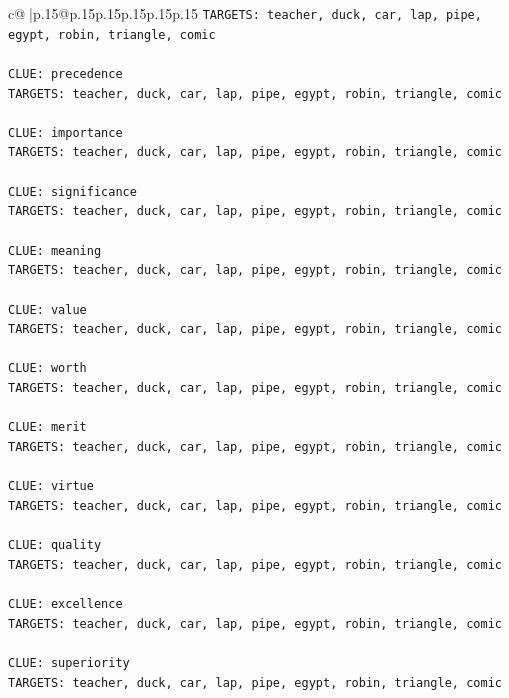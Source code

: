\documentclass{article}
\begin{document}
{\begin{supertabular}{c@{$\;$}|p{.15\linewidth}@{}p{.15\linewidth}p{.15\linewidth}p{.15\linewidth}p{.15\linewidth}p{.15\linewidth}}
{{{\texttt{TARGETS: teacher, duck, car, lap, pipe, egypt, robin, triangle, comic} \\
\\ 
\texttt{CLUE: precedence} \\
\texttt{TARGETS: teacher, duck, car, lap, pipe, egypt, robin, triangle, comic} \\
\\ 
\texttt{CLUE: importance} \\
\texttt{TARGETS: teacher, duck, car, lap, pipe, egypt, robin, triangle, comic} \\
\\ 
\texttt{CLUE: significance} \\
\texttt{TARGETS: teacher, duck, car, lap, pipe, egypt, robin, triangle, comic} \\
\\ 
\texttt{CLUE: meaning} \\
\texttt{TARGETS: teacher, duck, car, lap, pipe, egypt, robin, triangle, comic} \\
\\ 
\texttt{CLUE: value} \\
\texttt{TARGETS: teacher, duck, car, lap, pipe, egypt, robin, triangle, comic} \\
\\ 
\texttt{CLUE: worth} \\
\texttt{TARGETS: teacher, duck, car, lap, pipe, egypt, robin, triangle, comic} \\
\\ 
\texttt{CLUE: merit} \\
\texttt{TARGETS: teacher, duck, car, lap, pipe, egypt, robin, triangle, comic} \\
\\ 
\texttt{CLUE: virtue} \\
\texttt{TARGETS: teacher, duck, car, lap, pipe, egypt, robin, triangle, comic} \\
\\ 
\texttt{CLUE: quality} \\
\texttt{TARGETS: teacher, duck, car, lap, pipe, egypt, robin, triangle, comic} \\
\\ 
\texttt{CLUE: excellence} \\
\texttt{TARGETS: teacher, duck, car, lap, pipe, egypt, robin, triangle, comic} \\
\\ 
\texttt{CLUE: superiority} \\
\texttt{TARGETS: teacher, duck, car, lap, pipe, egypt, robin, triangle, comic} \\
}}}
\end{supertabular}}
\end{document}
